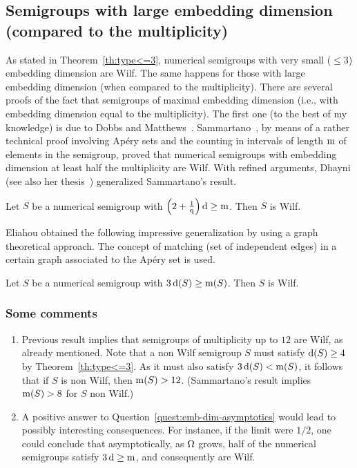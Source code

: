 \subsection{Semigroups with large embedding dimension (compared to the multiplicity)}\label{sec:large-emb-dim}
As stated in Theorem~\ref{th:type<=3}, numerical semigroups with very small ($\le 3$) embedding dimension are Wilf.
The same happens for those with large embedding dimension (when compared to the multiplicity). 
There are several proofs of the fact that semigroups of maximal embedding dimension (i.e., with embedding dimension equal to the multiplicity). The first one (to the best of my knowledge) is due to Dobbs and Matthews~\cite[Cor.~2.4]{DobbsMatthews2006}.
Sammartano~\cite[Th.~18]{Sammartano2012SF-Numerical}, by means of a rather technical proof involving Apéry sets and the counting in intervals of length $\operatorname{m}$ of elements in the semigroup, proved that numerical semigroups with embedding dimension at least half the multiplicity are Wilf. With refined arguments, 
Dhayni 
(see also her thesis~\cite[Th. 2.3.13]{Dhayni2017phd-Problems}) 
generalized Sammartano's result.

\begin{proposition}\label{wilf-particular:large-embedding-dim}
    Let $S$ be a numerical semigroup with $\left(2+\frac{1}{\operatorname{q}}\right)\operatorname{d}\ge \operatorname{m}$. Then $S$ is Wilf.
\end{proposition}

Eliahou obtained the following impressive generalization by using a graph theoretical approach. The concept of matching (set of independent edges) in a certain graph associated to the Apéry set is used. 

\begin{theorem}\label{th:large-embedding-dim-3}
	Let $S$ be a numerical semigroup with $3\operatorname{d}(S)\ge \operatorname{m}(S)$. Then $S$ is Wilf.
\end{theorem}

\subsubsection*{Some comments}
\begin{enumerate}
    \item Previous result implies that semigroups of multiplicity up to $12$ are Wilf, as already mentioned. 
    Note that a non Wilf semigroup $S$ must satisfy $\operatorname{d}(S)\ge 4$ by Theorem~\ref{th:type<=3}. As it must also satisfy $3\operatorname{d}(S)<\operatorname{m}(S)$, it follows that if $S$ is non Wilf, then $\operatorname{m}(S) > 12$. (Sammartano's result implies $\operatorname{m}(S) > 8$ for $S$ non Wilf.)
    \item A positive answer to Question~\ref{quest:emb-dim-asymptotics} would lead to possibly interesting consequences. For instance, if the limit were $1/2$, one could conclude that asymptotically, as $\operatorname{\Omega}$ grows, half of the numerical semigroups satisfy $3\operatorname{d}\ge \operatorname{m}$, and consequently are Wilf.
\end{enumerate}

